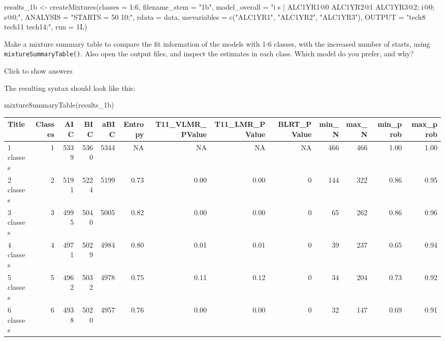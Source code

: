 \documentclass[
]{book}
\newenvironment{Shaded}{\begin{snugshade}}{\end{snugshade}}
\newcommand{\AttributeTok}[1]{\textcolor[rgb]{0.77,0.63,0.00}{#1}}
\newcommand{\DecValTok}[1]{\textcolor[rgb]{0.00,0.00,0.81}{#1}}
\newcommand{\FunctionTok}[1]{\textcolor[rgb]{0.00,0.00,0.00}{#1}}
\newcommand{\NormalTok}[1]{#1}
\newcommand{\OtherTok}[1]{\textcolor[rgb]{0.56,0.35,0.01}{#1}}
\newcommand{\SpecialCharTok}[1]{\textcolor[rgb]{0.00,0.00,0.00}{#1}}
\newcommand{\StringTok}[1]{\textcolor[rgb]{0.31,0.60,0.02}{#1}}
\begin{document}
\begin{Shaded}
\begin{Highlighting}[]
\NormalTok{results\_1b }\OtherTok{\textless{}{-}} 
  \FunctionTok{createMixtures}\NormalTok{(}\AttributeTok{classes =} \DecValTok{1}\SpecialCharTok{:}\DecValTok{6}\NormalTok{,}
                 \AttributeTok{filename\_stem =} \StringTok{"1b"}\NormalTok{,}
                 \AttributeTok{model\_overall =} \StringTok{"i s | ALC1YR1@0 ALC1YR2@1 ALC1YR3@2;}
\StringTok{                                  i@0;  s@0;"}\NormalTok{,}
                 \AttributeTok{ANALYSIS =} \StringTok{"STARTS = 50 10;"}\NormalTok{,}
                 \AttributeTok{rdata =}\NormalTok{ data, }
                 \AttributeTok{usevariables =} \FunctionTok{c}\NormalTok{(}\StringTok{"ALC1YR1"}\NormalTok{, }\StringTok{"ALC1YR2"}\NormalTok{, }\StringTok{"ALC1YR3"}\NormalTok{),}
                 \AttributeTok{OUTPUT =} \StringTok{"tech8 tech11 tech14;"}\NormalTok{,}
                 \AttributeTok{run =}\NormalTok{ 1L)}
\end{Highlighting}
\end{Shaded}

Make a mixture summary table to compare the fit information of the models with 1-6 classes, with the increased number of starts, using \texttt{mixtureSummaryTable()}. Also open the output files, and inspect the estimates in each class. Which model do you prefer, and why?

Click to show answers

The resulting syntax should look like this:

\begin{Shaded}
\begin{Highlighting}[]
\FunctionTok{mixtureSummaryTable}\NormalTok{(results\_1b)}
\end{Highlighting}
\end{Shaded}

\begin{tabular}[t]{l|r|r|r|r|r|r|r|r|r|r|r|r}
\hline
Title & Classes & AIC & BIC & aBIC & Entropy & T11\_VLMR\_PValue & T11\_LMR\_PValue & BLRT\_PValue & min\_N & max\_N & min\_prob & max\_prob\\
\hline
1 classes & 1 & 5339 & 5360 & 5344 & NA & NA & NA & NA & 466 & 466 & 1.00 & 1.00\\
\hline
2 classes & 2 & 5191 & 5224 & 5199 & 0.73 & 0.00 & 0.00 & 0 & 144 & 322 & 0.86 & 0.95\\
\hline
3 classes & 3 & 4995 & 5040 & 5005 & 0.82 & 0.00 & 0.00 & 0 & 65 & 262 & 0.86 & 0.96\\
\hline
4 classes & 4 & 4971 & 5029 & 4984 & 0.80 & 0.01 & 0.01 & 0 & 39 & 237 & 0.65 & 0.94\\
\hline
5 classes & 5 & 4962 & 5032 & 4978 & 0.75 & 0.11 & 0.12 & 0 & 34 & 204 & 0.73 & 0.92\\
\hline
6 classes & 6 & 4938 & 5020 & 4957 & 0.76 & 0.00 & 0.00 & 0 & 32 & 147 & 0.69 & 0.91\\
\hline
\end{tabular}
\end{document}
